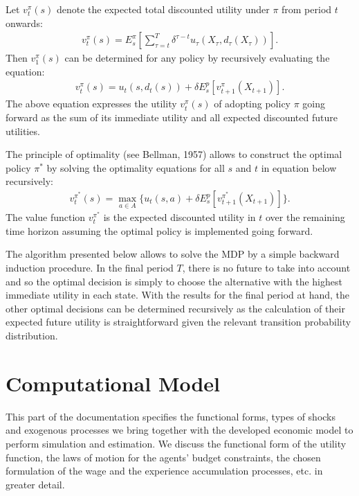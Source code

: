 \documentclass[letterpaper,10pt,english]{sphinxmanual}
\begin{document}
Let \(v^\pi_t(s)\) denote the expected total discounted utility under \(\pi\) from period \(t\) onwards:
\begin{equation*}
\begin{split}v^\pi_t(s) = E^\pi_{s}\left[ \sum^T_{\tau=t} \delta^{\tau - t}   u_\tau(X_\tau, d_\tau(X_\tau)) \right].\end{split}
\end{equation*}
Then \(v_1^\pi(s)\) can be determined for any policy by recursively evaluating the equation:
\begin{equation*}
\begin{split}v^\pi_t(s) = u_t(s, d_t(s)) + \delta E^p_{s} \left[v^\pi_{t + 1}(X_{t + 1})\right].\end{split}
\end{equation*}
The above equation expresses the utility \(v^\pi_t(s)\) of adopting policy \(\pi\) going forward as the sum of its immediate utility and all expected discounted future utilities.

The principle of optimality (see Bellman, 1957) allows to construct the optimal policy \(\pi^*\) by solving the optimality equations for all \(s\) and \(t\) in equation below recursively:
\begin{equation*}
\begin{split}v^{\pi^*}_t(s) = \max_{a \in A}\bigg\{ u_t(s, a) + \delta E^p_{s} \left[v^{\pi^*}_{t + 1}(X_{t + 1})\right] \bigg\}.\end{split}
\end{equation*}
The value function \(v^{\pi^*}_t\) is the expected discounted utility in \(t\) over the remaining time horizon assuming the optimal policy is implemented going forward.

The algorithm presented below allows to solve the MDP by a simple backward induction procedure. In the final period \(T\), there is no future to take into account and so the optimal decision is simply to choose the alternative with the highest immediate utility in each state. With the results for the final period at hand, the other optimal decisions can be determined recursively as the calculation of their expected future utility is straightforward given the relevant transition probability distribution.

\noindent{}


\chapter{Computational Model}
\label{\detokenize{computational_model:computational-model}}\label{\detokenize{computational_model::doc}}
This part of the documentation specifies the functional forms, types of shocks and exogenous processes we bring together with the developed economic model to perform simulation and estimation. We discuss the functional form of the utility function, the laws of motion for the agents’ budget constraints, the chosen formulation of the wage and the experience accumulation processes, etc. in greater detail.
\end{document}
